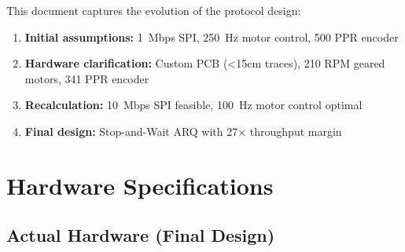 This document captures the evolution of the protocol design:
\begin{enumerate}
    \item \textbf{Initial assumptions:} 1~Mbps SPI, 250~Hz motor control, 500 PPR encoder
    \item \textbf{Hardware clarification:} Custom PCB (<15cm traces), 210 RPM geared motors, 341 PPR encoder
    \item \textbf{Recalculation:} 10~Mbps SPI feasible, 100~Hz motor control optimal
    \item \textbf{Final design:} Stop-and-Wait ARQ with 27× throughput margin
\end{enumerate}

\section{Hardware Specifications}

\subsection{Actual Hardware (Final Design)}

